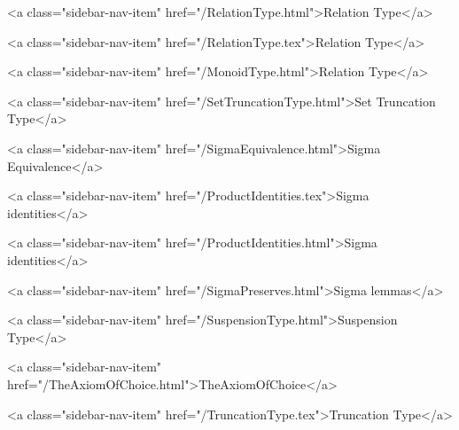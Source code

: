       
    
      
        
          <a class="sidebar-nav-item" href="/RelationType.html">Relation Type</a>
        
      
    
      
        
          <a class="sidebar-nav-item" href="/RelationType.tex">Relation Type</a>
        
      
    
      
        
          <a class="sidebar-nav-item" href="/MonoidType.html">Relation Type</a>
        
      
    
      
        
          <a class="sidebar-nav-item" href="/SetTruncationType.html">Set Truncation Type</a>
        
      
    
      
        
          <a class="sidebar-nav-item" href="/SigmaEquivalence.html">Sigma Equivalence</a>
        
      
    
      
        
          <a class="sidebar-nav-item" href="/ProductIdentities.tex">Sigma identities</a>
        
      
    
      
        
          <a class="sidebar-nav-item" href="/ProductIdentities.html">Sigma identities</a>
        
      
    
      
        
          <a class="sidebar-nav-item" href="/SigmaPreserves.html">Sigma lemmas</a>
        
      
    
      
        
          <a class="sidebar-nav-item" href="/SuspensionType.html">Suspension Type</a>
        
      
    
      
        
          <a class="sidebar-nav-item" href="/TheAxiomOfChoice.html">TheAxiomOfChoice</a>
        
      
    
      
        
          <a class="sidebar-nav-item" href="/TruncationType.tex">Truncation Type</a>
        
